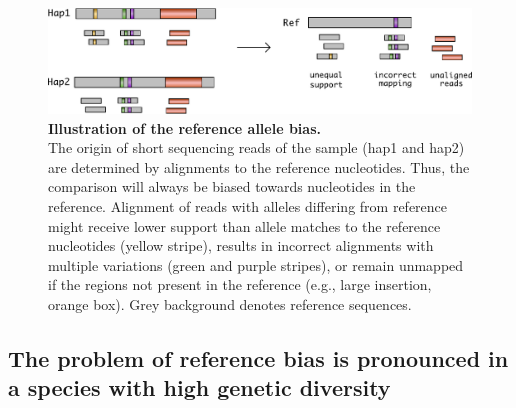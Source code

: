 \documentclass[../main.tex]{subfiles}
\begin{document}
\bigskip

\begin{figure}[!htb]
    \centering
    \includegraphics[width=\textwidth]{intro/fig2.pdf}
        \vspace{3mm}
        \caption[Illustration of the reference allele bias]{\textbf{Illustration of the reference allele bias.} \\
        \footnotesize{The origin of short sequencing reads of the sample (hap1 and hap2) are determined by alignments to the reference nucleotides. Thus, the comparison will always be biased towards nucleotides in the reference. Alignment of reads with alleles differing from reference might receive lower support than allele matches to the reference nucleotides (yellow stripe), results in incorrect alignments with multiple variations (green and purple stripes), or remain unmapped if the regions not present in the reference (e.g., large insertion, orange box). Grey background denotes reference sequences.}}
        \label{fig12:bias}
\end{figure}

\subsection{The problem of reference bias is pronounced in a species with high genetic diversity}
\end{document}
